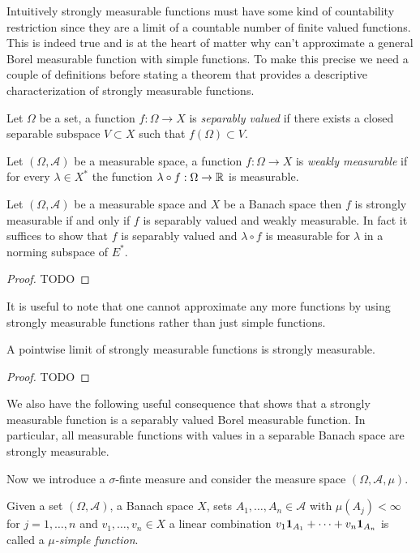 Intuitively strongly measurable functions must have some kind of
countability restriction since they are a limit of a countable number
of finite valued functions.  This is indeed true and is at the heart
of matter why can't approximate a general Borel measurable function
with simple functions.  To make this precise we need a couple of
definitions before stating a theorem that provides a descriptive
characterization of strongly measurable functions.

\begin{defn}Let $\Omega$ be a set, a function $f : \Omega \to X$ is
  \emph{separably valued} if there exists a closed separable subspace $V
  \subset X$ such that $f(\Omega) \subset V$.  
\end{defn}

\begin{defn}Let $(\Omega, \mathcal{A})$ be a measurable space, a function $f : \Omega \to X$ is
  \emph{weakly measurable} if for every $\lambda \in X^*$ the function
  $\lambda \circ f : \Omega \to \mathbb{R}$ is measurable. 
\end{defn}

\begin{thm}Let $(\Omega, \mathcal{A})$ be a measurable space and $X$
  be a Banach space then $f$ is strongly measurable if and only if $f$
  is separably valued and weakly measurable.  In fact it suffices to
  show that $f$ is separably valued and $\lambda \circ f$ is
  measurable for $\lambda$ in a norming subspace of $E^*$.
\end{thm}
\begin{proof}
TODO
\end{proof}

It is useful to note that one cannot approximate any more functions by
using strongly measurable functions rather than just simple functions.
\begin{cor}A pointwise limit of strongly measurable functions is strongly measurable.
\end{cor}
\begin{proof}
TODO
\end{proof}

We also have the following useful consequence that shows that a
strongly measurable function is a separably valued Borel measurable
function.  In particular, all measurable functions with values in a
separable Banach space are strongly measurable.

Now we introduce a $\sigma$-finte measure and consider the measure
space $(\Omega, \mathcal{A}, \mu)$.  
\begin{defn}Given a set $(\Omega, \mathcal{A})$, a Banach space $X$,
  sets $A_1, \dotsc, A_n \in \mathcal{A}$ with $\mu(A_j) < \infty$ for
  $j=1, \dotsc, n$ and $v_1, \dotsc, v_n \in X$ a
  linear combination $v_1
  \textbf{1}_{A_1} + \cdots + v_n \textbf{1}_{A_n}$ is called
  a \emph{$\mu$-simple function}.
\end{defn}

